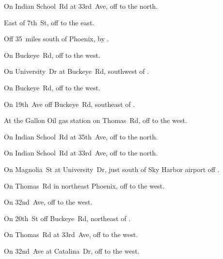 
\begin{LocationList}

On Indian School~Rd at 33rd~Ave, off   to the north.

East of 7th~St, off   to the east.

Off  35~miles south of Phoenix, by  .

On Buckeye~Rd, off    to the west.

On University~Dr at Buckeye~Rd, southwest of  .

On Buckeye~Rd, off    to the west.

On 19th~Ave off Buckeye~Rd, southeast of   .

At the Gallon Oil gas station on Thomas~Rd, off   to the west.

\Location{\GarageHQ \Garage}
On Indian School~Rd at 35th~Ave, off   to the north.

On Indian School~Rd at 33rd~Ave, off   to the north.

On Magnolia~St at University~Dr, just south of Sky Harbor airport off  .

On Thomas~Rd in northeast Phoenix, off   to the west.

\Location{\RecruitmentAgency \Recruitment}
On 32nd~Ave, off   to the west.

On 20th~St off Buckeye~Rd, northeast of   .

On Thomas~Rd at 33rd~Ave, off   to the west.

On 32nd~Ave at Catalina~Dr, off   to the west.

\end{LocationList}
